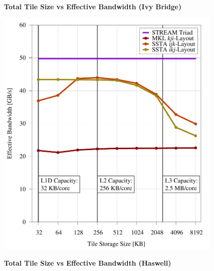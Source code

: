 \documentclass{sig-alternate-05-2015}
\begin{document}
\begin{figure}[!bth]
  \captionsetup{width=0.39\textwidth}
  \centering
  \begin{minipage}{0.49\textwidth}
    \centering
    \label{fig:results:tile_size_ivb}
    \caption{
      \textbf{Total Tile Size vs Effective Bandwidth (Ivy Bridge)}
    }
    \includegraphics[width=0.99\columnwidth]{figures/post_tsb_tw_sweep_full_matrix_double_precision_production_edison_ivb_e5_2695_v2_08_31_2016_09_03_2016_12pus.pdf}
  \end{minipage}
  \begin{minipage}{0.49\textwidth}
    \centering
    \label{fig:results:tile_size_hsw}
    \caption{
      \textbf{Total Tile Size vs Effective Bandwidth (Haswell)}
    }

\end{minipage}
\end{figure}
\end{document}
